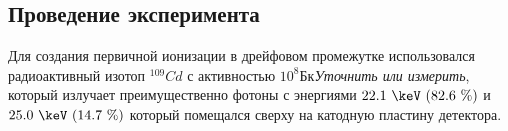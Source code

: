 \subsection{Проведение эксперимента}
Для создания первичной ионизации в дрейфовом промежутке использовался радиоактивный изотоп $^{109}Cd$ с активностью $10^8 \text{Бк}$\textit{Уточнить или измерить}, который излучает преимущественно фотоны с энергиями $22.1~\keV~(82.6~\%)$ и $25.0~\keV~(14.7~\%)$ который помещался сверху на катодную пластину детектора. 

